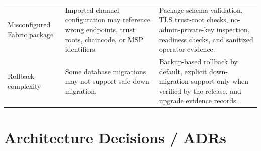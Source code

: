 \documentclass[11pt,a4paper]{article}
\begin{document}
\begin{longtable}{L{36mm}L{70mm}L{36mm}}
Misconfigured Fabric package & Imported channel configuration may reference wrong endpoints, trust roots, chaincode, or MSP identifiers. & Package schema validation, TLS trust-root checks, no-admin-private-key inspection, readiness checks, and sanitized operator evidence. \\
Rollback complexity & Some database migrations may not support safe down-migration. & Backup-based rollback by default, explicit down-migration support only when verified by the release, and upgrade evidence records. \\
\bottomrule
\end{longtable}

\section{Architecture Decisions / ADRs}
\end{document}
